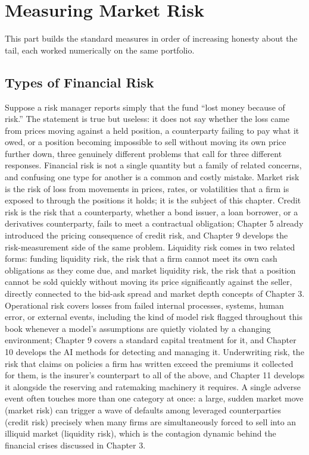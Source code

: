 \documentclass[../ai_in_finance]{subfiles}
\begin{document}
\section{Measuring Market Risk}

This part builds the standard measures in order of increasing honesty about the tail, each worked numerically on the same portfolio.

\subsection{Types of Financial Risk}
\label{sec:risk-types}

Suppose a risk manager reports simply that the fund ``lost money because of risk.'' The statement is true but useless: it does not say whether the loss came from prices moving against a held position, a counterparty failing to pay what it owed, or a position becoming impossible to sell without moving its own price further down, three genuinely different problems that call for three different responses. Financial risk is not a single quantity but a family of related concerns, and confusing one type for another is a common and costly mistake.
Market risk is the risk of loss from movements in prices, rates, or volatilities that a firm is exposed to through the positions it holds; it is the subject of this chapter.
Credit risk is the risk that a counterparty, whether a bond issuer, a loan borrower, or a derivatives counterparty, fails to meet a contractual obligation; Chapter 5 already introduced the pricing consequence of credit risk, and Chapter 9 develops the risk-measurement side of the same problem.
Liquidity risk comes in two related forms: funding liquidity risk, the risk that a firm cannot meet its own cash obligations as they come due, and market liquidity risk, the risk that a position cannot be sold quickly without moving its price significantly against the seller, directly connected to the bid-ask spread and market depth concepts of Chapter 3.
Operational risk covers losses from failed internal processes, systems, human error, or external events, including the kind of model risk flagged throughout this book whenever a model's assumptions are quietly violated by a changing environment; Chapter 9 covers a standard capital treatment for it, and Chapter 10 develops the AI methods for detecting and managing it.
Underwriting risk, the risk that claims on policies a firm has written exceed the premiums it collected for them, is the insurer's counterpart to all of the above, and Chapter 11 develops it alongside the reserving and ratemaking machinery it requires.
A single adverse event often touches more than one category at once: a large, sudden market move (market risk) can trigger a wave of defaults among leveraged counterparties (credit risk) precisely when many firms are simultaneously forced to sell into an illiquid market (liquidity risk), which is the contagion dynamic behind the financial crises discussed in Chapter 3.
\end{document}
